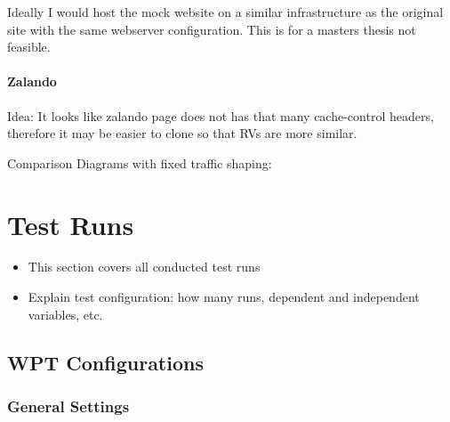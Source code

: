 Ideally I would host the mock website on a similar infrastructure as the original site with the same webserver configuration. This is for a masters thesis not feasible.





\paragraph{Zalando}

Idea: It looks like zalando page does not has that many cache-control headers, therefore it may be easier to clone so that RVs are more similar.

Comparison Diagrams with fixed traffic shaping:








\section{Test Runs}

\begin{itemize}
    \item This section covers all conducted test runs
    \item Explain test configuration: how many runs, dependent and independent variables, etc.
\end{itemize}






\subsection{WPT Configurations}


\subsubsection{General Settings}

